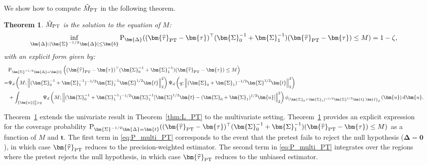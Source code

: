 \documentclass[11pt]{article}
\def\P{{\mathrm P}}
\def\d{{\mathrm d}}
\newcommand{\htau}{\widehat\tau}
\numberwithin{equation}{section}
\newtheorem{theorem}{Theorem}[section]
\theoremstyle{definition}
\begin{document}
We show how to compute $\hat{M}_{\rm PT}$ in the following theorem.
\begin{theorem}\label{prop:CI_multi_PT}
  $\hat{M}_{\rm PT}$ is the solution to the equation of $M$:
  \begin{align*}
    \inf_{\bm{\Delta}: \lvert \bm{\Sigma}^{-1/2} \bm{\Delta}\rvert \le \bm{b}} \P_{\bm{\Delta}}((\bm{\htau}_{\rm PT} - \bm{\tau})^\top (\bm{\Sigma}_0^{-1} + \bm{\Sigma}_1^{-1}) (\bm{\htau}_{\rm PT} - \bm{\tau}) \le M) = 1-\zeta,
  \end{align*} 
  with an explicit form given by:
  \begin{align}\label{eq:P_multi_PT}
    &\P_{\bm{\Sigma}^{-1/2}\bm{\Delta} = \bm{t}}\left((\bm{\htau}_{\rm PT}-\bm{\tau})^\top (\bm{\Sigma}_0^{-1} + \bm{\Sigma}_1^{-1})(\bm{\htau}_{\rm PT}-\bm{\tau})\le M\right) \nonumber\\
    =& \Psi_d\left(M;\left\lVert (\bm{\Sigma}_0^{-1} + \bm{\Sigma}_1^{-1})^{-1/2} \bm{\Sigma}_1^{-1} \bm{\Sigma}^{1/2} \bm{t}\right\rVert_2^2\right) \Psi_d\left(q; \left\lVert (\bm{\Sigma}_0 + \bm{\Sigma}_1)^{-1/2} \bm{\Sigma}^{1/2} \bm{t}\right\rVert_2^2\right) \nonumber\\
    &+ \int_{\lVert \bm{u} \rVert_2^2 > q} \Psi_d\left(M;\left\lVert (\bm{\Sigma}_0^{-1} + \bm{\Sigma}_1^{-1})^{-1/2} \bm{\Sigma}_1^{-1} [\bm{\Sigma}^{1/2} \bm{t} - (\bm{\Sigma}_0+ \bm{\Sigma}_1)^{1/2} \bm{u}]\right\rVert_2^2\right) \phi_{(\bm{\Sigma}_0 + \bm{\Sigma}_1)^{-1/2} \bm{\Sigma}^{1/2} \bm{t}, \bm{I}_d}\left(\bm{u}\right) \d \bm{u}.
  \end{align}
\end{theorem}


Theorem~\ref{prop:CI_multi_PT} extends the univariate result in Theorem~\ref{thm:L_PT} to the multivariate setting. Theorem~\ref{prop:CI_multi_PT} provides an explicit expression for the coverage probability $\P_{\bm{\Sigma}^{-1/2}\bm{\Delta} = \bm{t}}((\bm{\htau}_{\rm PT}-\bm{\tau})^\top (\bm{\Sigma}_0^{-1} + \bm{\Sigma}_1^{-1})(\bm{\htau}_{\rm PT}-\bm{\tau})\le M)$ as a function of $M$ and $\bm{t}$. The first term in \eqref{eq:P_multi_PT} corresponds to the event that the pretest fails to reject the null hypothesis ($\bm{\Delta} = \bm{0}$), in which case $\bm{\htau}_{\rm PT}$ reduces to the precision-weighted estimator. The second term in \eqref{eq:P_multi_PT} integrates over the regions where the pretest rejects the null hypothesis, in which case $\bm{\htau}_{\rm PT}$ reduces to the unbiased estimator.
\end{document}
